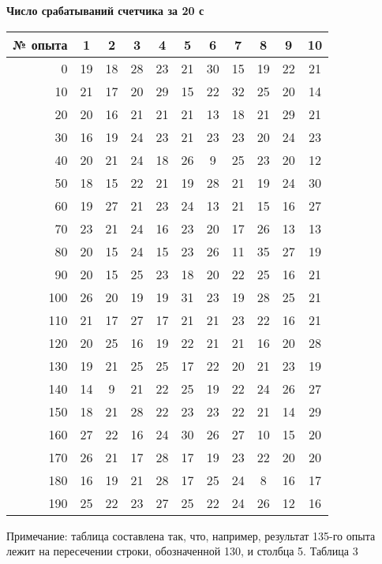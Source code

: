 \documentclass[a4paper, 10pt]{article}
\begin{document}
\begin{enumerate}
\begin{enumerate}
\begin {center}
 {\textbf{Число срабатываний счетчика за 20 с}}
	\begin{tabular}{|r|c|c|c|c|c|c|c|c|c|c|}
\hline
№ опыта&1&2&3&4&5&6&7&8&9&10\\
\hline
0&19&18&28&23&21&30&15&19&22&21\\
\hline
10&21&17&20&29&15&22&32&25&20&14\\
\hline
20&20&16&21&21&21&13&18&21&29&21\\
\hline
30&16&19&24&23&21&23&23&20&24&23\\
\hline
40&20&21&24&18&26&9&25&23&20&12\\
\hline
50&18&15&22&21&19&28&21&19&24&30\\
\hline
60&19&27&21&23&24&13&21&15&16&27\\
\hline
70&23&21&24&16&23&20&17&26&13&13\\
\hline
80&20&15&24&15&23&26&11&35&27&19\\
\hline
90&20&15&25&23&18&20&22&25&16&21\\
\hline
100&26&20&19&19&31&23&19&28&25&21\\
\hline
110&21&17&27&17&21&21&23&22&16&21\\
\hline
120&20&25&16&19&22&21&21&16&20&28\\
\hline
130&19&21&25&25&17&22&20&21&23&19\\
\hline
140&14&9&21&22&25&19&22&24&26&27\\
\hline
150&18&21&28&22&23&23&22&21&14&29\\
\hline
160&27&22&16&24&30&26&27&10&15&20\\
\hline
170&26&21&17&28&17&19&23&22&20&20\\
\hline
180&16&19&21&28&17&25&24&8&16&17\\
\hline
190&25&22&23&27&25&22&24&26&12&16\\
\hline
\end{tabular}		
			 
			{ Примечание: таблица составлена так, что, например, результат 135-го опыта лежит на пересечении строки, обозначенной 130, и столбца 5.}
\newpage
		  \hspace{79 mm} Таблица 3
		

\end{center}
\end{enumerate}
\end{enumerate}
\end{document}
